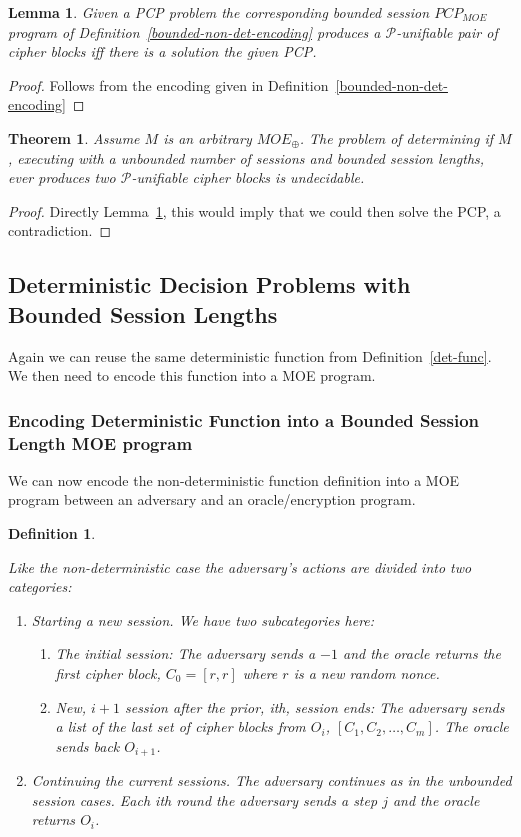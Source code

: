 \documentclass{easychair}
\newtheorem{definition}{Definition}
\newtheorem{theorem}{Theorem}
\newtheorem{lemma}{Lemma}
\begin{document}
\begin{lemma}\label{lemma:bounded_pcp_to_moe}
	Given a PCP problem the corresponding
	bounded session $PCP_{MOE}$ program of Definition~\ref{bounded-non-det-encoding}
	produces a $\mathcal{P}$-unifiable pair of cipher blocks
	iff there is a solution the given PCP. 
\end{lemma}
\begin{proof}
	Follows from the encoding given in Definition~\ref{bounded-non-det-encoding}
\end{proof}

\begin{theorem}
	Assume $M$ is an arbitrary $MOE_{\oplus}$. The problem
	of determining if $M$, executing with 
	a unbounded number of sessions and bounded session
	lengths, ever produces two  $\mathcal{P}$-unifiable cipher blocks is undecidable. 
\end{theorem}
\begin{proof}
	Directly Lemma~\ref{lemma:bounded_pcp_to_moe}, this would
	imply that we could then solve the PCP, a contradiction.   
\end{proof}

\subsection{Deterministic Decision Problems with 
	Bounded Session Lengths}
Again we can reuse the same deterministic function 
from Definition~\ref{det-func}. We then need to 
encode this function into a MOE program. 

\subsubsection{Encoding Deterministic Function into a Bounded Session Length MOE program}\label{sec:det-bounded-sessions}
We can now encode the non-deterministic function 
definition into a MOE program between an 
adversary and an oracle/encryption program. 

\begin{definition}\label{bounded-det-encoding}

Like the non-deterministic case the adversary's actions are divided into two categories:
\begin{enumerate}
	\item Starting a new session.
	We have two subcategories here:
	\begin{enumerate}
		\item The initial session: The adversary sends a 
		$-1$ and the oracle returns the first cipher block,
		$C_0 = [r,r]$ where $r$ is a new random nonce. 
		\item New, $i+1$ session after the prior, ith, session ends: 
		The adversary sends a list of the last set of cipher blocks from $O_i$, $[C_1, C_2, \ldots, C_m]$. The oracle sends back $O_{i+1}$. 
	\end{enumerate}
	\item Continuing the current sessions.
	The adversary continues as in the unbounded session 
	cases. Each ith round the adversary sends a step $j$ and
	the oracle returns $O_{i}$.
\end{enumerate}
\end{definition}
\end{document}
